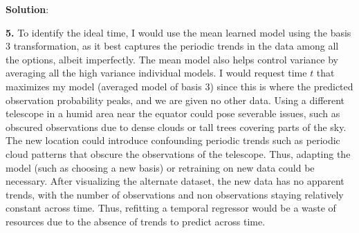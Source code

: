 \documentclass[submit]{../harvardml}
\newenvironment{solution}{
    \vspace{2mm}
    \color{black}\noindent\textbf{Solution}:
}{}
\begin{document}
\begin{solution}
\begin{tcolorbox}
        \textbf{5.} To identify the ideal time, I would use the mean learned model using the basis 3 transformation, as it best captures the periodic trends in the data among all the options, albeit imperfectly. The mean model also helps control variance by averaging all the high variance individual models. I would request time $t$ that maximizes my model (averaged model of basis 3) since this is where the predicted observation probability peaks, and we are given no other data. Using a different telescope in a humid area near the equator could pose severable issues, such as obscured observations due to dense clouds or tall trees covering parts of the sky. The new location could introduce confounding periodic trends such as periodic cloud patterns that obscure the observations of the telescope. Thus, adapting the model (such as choosing a new basis) or retraining on new data could be necessary. After visualizing the alternate dataset, the new data has no apparent trends, with the number of observations and non observations staying relatively constant across time. Thus, refitting a temporal regressor would be a waste of resources due to the absence of trends to predict across time.
    \end{tcolorbox}
\end{solution}

\end{document}
